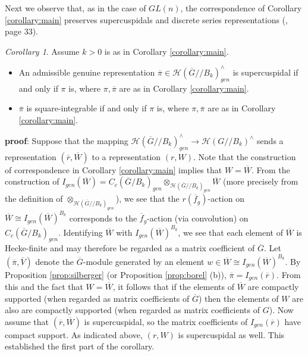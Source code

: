 \documentclass[12pt,letterpaper]{amsart}
\theoremstyle{definition}
\theoremstyle{remark}
\newtheorem{corollary}[theorem]{Corollary}
\begin{document}
Next we observe that, as in the case
of $GL(n)$, the correspondence of Corollary \ref{corollary:main}
preserves supercuspidals and discrete series 
representations (\cite{H}, page 33).

\begin{corollary}
Assume $k>0$ is as in Corollary \ref{corollary:main}.
\begin{itemize}
\item An admissible genuine representation
$\overline{\pi}\in
\mathcal{H}(\overline{G}//B_k)_{gen}^\wedge$ 
is supercuspidal if and only if
$\pi$ is, where $\pi,\overline{\pi}$ are as in Corollary
\ref{corollary:main}.

\item
$\overline{\pi}$ is square-integrable 
if and only if $\pi$ is, where $\pi,\overline{\pi}$ 
are as in Corollary \ref{corollary:main}.
\end{itemize}
\end{corollary}

{\bf proof}: Suppose that the mapping
$\mathcal{H}(\overline{G}//B_k)_{gen}^\wedge
\rightarrow \mathcal{H}(G//B_k)^\wedge$
sends a representation $(\overline{r},\overline{W})$ 
to a representation $(r,W)$. Note that the construction of
correspondence in Corollary \ref{corollary:main} implies that
$W=\overline{W}$.
From the construction of $I_{gen}(\overline{W})=
C_c(\overline{G}/B_k)_{gen}
\otimes_{\mathcal{H}(\overline{G}//B_k)_{gen}}\overline{W}$
(more precisely from the definition of 
$\otimes_{\mathcal{H}(\overline{G}//B_k)_{gen}}$), we
see that the $r(\overline{f}_g)$-action on 
$\overline{W}\cong I_{gen}(\overline{W})^{B_k}$
corresponds to the $\overline{f}_g$-action (via convolution)
on $C_c(\overline{G}/B_k)_{gen}$. 
Identifying $\overline{W}$ with $I_{gen}(\overline{W})^{B_k}$, 
we see that each element of
$\overline{W}$ is Hecke-finite and may therefore be regarded as 
a matrix coefficient of
$\overline{G}$. Let $(\overline{\pi},\overline{V})$
denote the $\overline{G}$-module generated by
an element $w\in \overline{W}\cong I_{gen}(\overline{W})^{B_k}$. 
By Proposition \ref{prop:silberger} (or Proposition \ref{prop:borel} (b)), 
$\overline{\pi}=I_{gen}(\overline{r})$.
From this and the fact that $W=\overline{W}$, it 
follows that if the elements of $\overline{W}$
are compactly supported (when regarded as matrix coefficients of $\overline{G}$)
then the elements of $W$ are also are compactly supported
(when regarded as matrix coefficients of $G$).
Now assume that $(\overline{r},\overline{W})$ is
supercuspidal, so the matrix coefficients of $I_{gen}(\overline{r})$
have compact support. As indicated above, $(r,W)$ is supercuspidal as well. 
This established the first part of the corollary.
\end{document}

